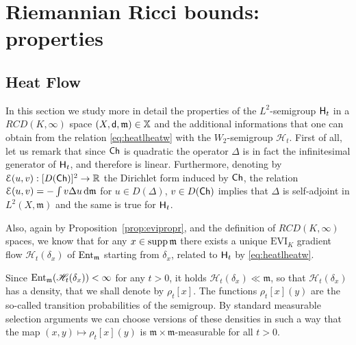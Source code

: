 \documentclass[reqno,11pt]{article}
\numberwithin{equation}{section}
\newcommand{\C}{\mathbb{C}}
\newcommand{\R}{\mathbb{R}}
\newcommand{\mm}{{\mbox{\boldmath$m$}}}
\newcommand{\sfd}{{\sf d}}
\newcommand{\supp}{\mathop{\rm supp}\nolimits}   %
\renewcommand{\d}{{\mathrm d}}
\newcommand{\EVI}[4]{\mathrm{EVI}_{#4}(#1,{#2}_W,#3)}
\newcommand{\entv}{{\rm Ent}_{\mm}}                    %
\newcommand{\X}{\mathbb X}
\renewcommand{\C}{{\rm Ch}}
\newcommand{\entr}[2]{{\rm Ent}_{#2}(#1)}              %
\newcommand{\rcd}[2]{RCD(#1,#2)}
\newcommand{\heatl}{{\sf H}}
\newcommand{\heatw}{{\mathscr H}}
\newcommand{\ke}[2]{\heatw_{#2}(\delta_{#1})}
\newcommand{\ked}[2]{\rho_{#2}[#1]}\renewcommand{\C}{{\sf Ch}}
\newcommand{\Deltam}{\Delta}
\renewcommand{\EVI}{\ensuremath{\mathrm{EVI}}}
\renewcommand{\mm}{\mathfrak m}
\begin{document}
\section{Riemannian Ricci bounds: properties}\label{sec:rcdprop}


\subsection{Heat Flow}\label{sub7}

In this section we study more in detail the properties of the
$L^2$-semigroup $\heatl_t$ in a $\rcd K\infty$ space
$(X,\sfd,\mm)\in\X$ and the additional informations that one can
obtain from the relation \eqref{eq:heatlheatw} with the
$W_2$-semigroup $\heatw_t$. First of all, let us remark that since
$\C$ is quadratic the operator $\Deltam$ is in fact the
infinitesimal generator of $\heatl_t$, and therefore is linear.
Furthermore, denoting by $\mathcal E(u,v):[D(\C)]^2\to\R$ the
Dirichlet form induced by $\C$, the relation ${\cal E}(u,v)=-\int
v\Deltam u\,\d\mm$ for $u\in D(\Deltam)$, $v\in D(\C)$ implies that
$\Deltam$ is self-adjoint in $L^2(X,\mm)$ and the same is true for
$\heatl_t$.

Also, again by Proposition~\ref{prop:evipropr}, and the definition
of $\rcd K\infty$ spaces, we know that for any $x\in\supp\mm$ there
exists a unique $\EVI_K$ gradient flow $\heatw_t(\delta_x)$ of
$\entv$ starting from $\delta_x$, related to $\heatl_t$ by
\eqref{eq:heatlheatw}.

Since $\entr{\ke xt}\mm<\infty$ for any $t>0$, it holds $\ke
xt\ll\mm$, so that $\ke xt$ has a density, that we shall denote by
$\ked xt$. The functions $\ked xt (y)$ are the so-called transition
probabilities of the semigroup. By standard measurable selection
arguments we can choose versions of these densities in such a way
that the map $(x,y)\mapsto\ked xt(y)$ is $\mm\times\mm$-measurable
for all $t>0$.
\end{document}
